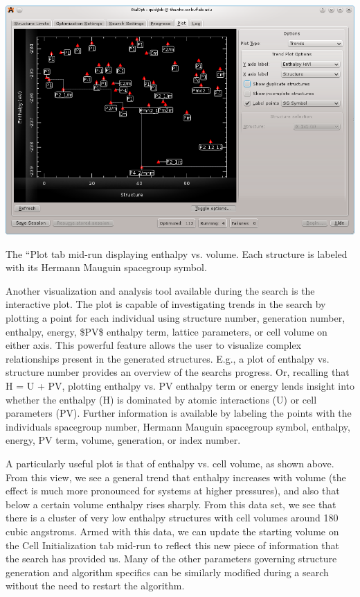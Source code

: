 \begin{DoxyImage}
\includegraphics[width=\textwidth]{trend-view.png}
\caption{The ``\+Plot\textquotesingle{}\textquotesingle{} tab mid-\/run displaying enthalpy vs. volume. Each structure is labeled with its Hermann Mauguin spacegroup symbol.}
\end{DoxyImage}


Another visualization and analysis tool available during the search is the interactive plot. The plot is capable of investigating trends in the search by plotting a point for each individual using structure number, generation number, enthalpy, energy, \$\+P\+V\$ enthalpy term, lattice parameters, or cell volume on either axis. This powerful feature allows the user to visualize complex relationships present in the generated structures. E.\+g., a plot of enthalpy vs. structure number provides an overview of the search\textquotesingle{}s progress. Or, recalling that H = U + P\+V, plotting enthalpy vs. P\+V enthalpy term or energy lends insight into whether the enthalpy (H) is dominated by atomic interactions (U) or cell parameters (P\+V). Further information is available by labeling the points with the individual\textquotesingle{}s spacegroup number, Hermann Mauguin spacegroup symbol, enthalpy, energy, P\+V term, volume, generation, or index number.

A particularly useful plot is that of enthalpy vs. cell volume, as shown above. From this view, we see a general trend that enthalpy increases with volume (the effect is much more pronounced for systems at higher pressures), and also that below a certain volume enthalpy rises sharply. From this data set, we see that there is a cluster of very low enthalpy structures with cell volumes around 180 cubic angstroms. Armed with this data, we can update the starting volume on the Cell Initialization tab mid-\/run to reflect this new piece of information that the search has provided us. Many of the other parameters governing structure generation and algorithm specifics can be similarly modified during a search without the need to restart the algorithm.

